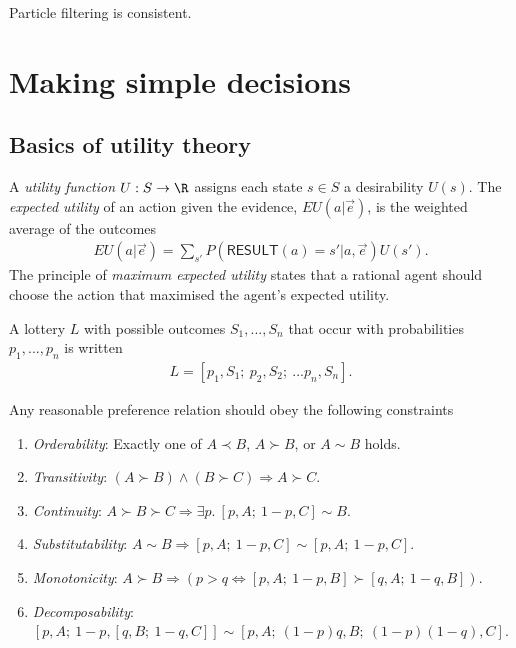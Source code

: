 \documentclass{article}
\begin{document}
\begin{theorem}
    Particle filtering is consistent.
\end{theorem}

\section{Making simple decisions}

\subsection{Basics of utility theory}

\begin{definition}
    A \emph{utility function} $U:S\to\R$ assigns each state $s\in S$ a desirability
    $U(s)$. The \emph{expected utility} of an action given the evidence, $EU(a|\vec e)$,
    is the weighted average of the outcomes
    \begin{align*}
        EU(a|\vec e)=\sum_{s'} P(\textsf{RESULT}(a)=s'|a,\vec e)U(s').
    \end{align*}
    The principle of \emph{maximum expected utility} states that a rational agent
    should choose the action that maximised the agent's expected utility.
\end{definition}

\begin{definition}
    A lottery $L$ with possible outcomes $S_1,...,S_n$ that occur with probabilities
    $p_1,...,p_n$ is written
    \begin{align*}
        L=[p_1,S_1;\:p_2,S_2;\:... p_n,S_n].
    \end{align*}
\end{definition}

\begin{definition}
    Any reasonable preference relation should obey the following constraints
    \begin{enumerate}
        \item \emph{Orderability}: Exactly one of $A\prec B$, $A\succ B$, or $A\sim B$ holds.
        \item \emph{Transitivity}: $(A \succ B)\wedge(B\succ C) \Rightarrow A\succ C$.
        \item \emph{Continuity}: $A\succ B\succ C\Rightarrow \exists p.\: [p,A;\:1-p,C]\sim B$.
        \item \emph{Substitutability}: $A\sim B\Rightarrow [p,A;\:1-p,C]\sim [p,A;\:1-p,C]$.
        \item \emph{Monotonicity}: $A\succ B\Rightarrow (p>q\Leftrightarrow [p,A;\:1-p,B]\succ[q,A;\:1-q,B])$.
        \item \emph{Decomposability}: $[p,A;\:1-p,[q,B;\:1-q,C]]\sim[p,A;\:(1-p)q,B;\:(1-p)(1-q),C]$.
    \end{enumerate}
\end{definition}
\end{document}
